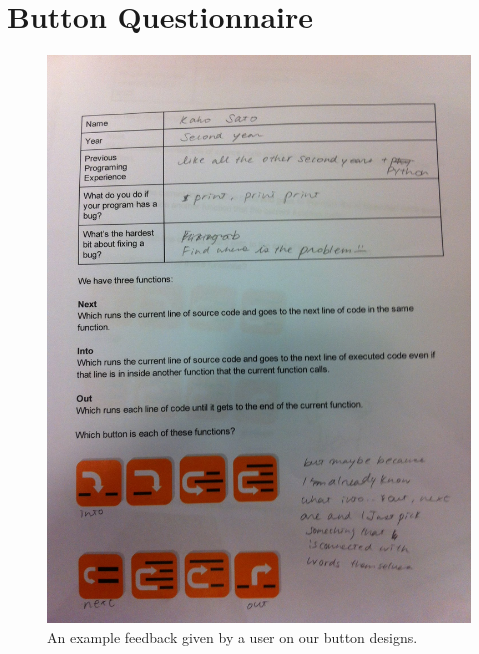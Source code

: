 \documentclass[11pt, a4paper]{article}
\begin{document}
\section{Button Questionnaire}
\label{sec:buttonquestionnaire}
\begin{figure}[h!]
\centering
\includegraphics[width=\textwidth]{questionnair2.jpg}
\caption{An example feedback given by a user on our button designs.}
\end{figure}
\end{document}
